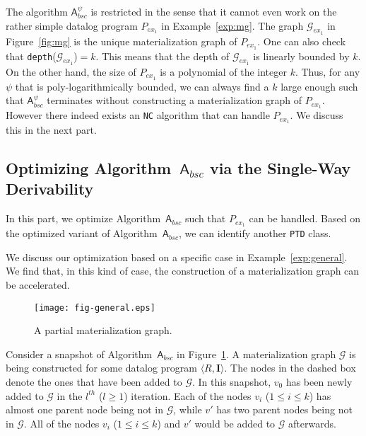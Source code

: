 \documentclass[final,1p,times]{elsarticle}
\begin{document}
The algorithm $\mathsf{A}_{bsc}^{\psi}$ is restricted in the sense that it cannot even work on the
rather simple datalog program $P_{ex_1}$ in Example~\ref{exp:mg}.
The graph $\mathcal{G}_{ex_1}$ in Figure~\ref{fig:mg} is the unique materialization graph of $P_{ex_1}$.
One can also check that \texttt{depth}($\mathcal{G}_{ex_1}$)$=k$.
This means that the depth of $\mathcal{G}_{ex_1}$ is linearly bounded by $k$.
On the other hand, the size of $P_{ex_1}$ is a polynomial of the integer $k$.
Thus, for any $\psi$ that is poly-logarithmically bounded, we can always find a $k$ large
enough such that $\mathsf{A}_{bsc}^{\psi}$ terminates without constructing a materialization
graph of $P_{ex_1}$.
However there indeed exists an \texttt{NC} algorithm that can handle $P_{ex_1}$.
We discuss this in the next part.

\subsection{Optimizing Algorithm~$\mathsf{A}_{bsc}$ via the Single-Way Derivability}

In this part, we optimize Algorithm~$\mathsf{A}_{bsc}$ such that $P_{ex_1}$
can be handled. Based on the optimized variant of Algorithm~$\mathsf{A}_{bsc}$,
we can identify another \texttt{PTD} class.

We discuss our optimization based on a specific case in Example~\ref{exp:general}.
We find that, in this kind of case, the construction of a materialization graph can be accelerated.

\begin{figure}[htbp]
\begin{center}
\texttt{[image: fig-general.eps]}
\caption{A partial materialization graph.}
\label{fig:general}
\end{center}
\end{figure}

\begin{example}\label{exp:general}
Consider a snapshot of Algorithm~$\mathsf{A}_{bsc}$ in
Figure~\ref{fig:general}. A materialization graph $\mathcal{G}$
is being constructed for some datalog program $\langle R, \textbf{I}\rangle$.
The nodes in the dashed box denote the ones that have been added to $\mathcal{G}$.
In this snapshot, $v_0$ has been newly added
to $\mathcal{G}$ in the $l^{th}$ ($l\geq 1$) iteration.
Each of the nodes $v_i$ ($1\leq i\leq k$) has almost one parent node being not in $\mathcal{G}$,
while $v'$ has two parent nodes being not in $\mathcal{G}$.
All of the nodes $v_i$ ($1\leq i\leq k$) and $v'$ would be added to $\mathcal{G}$
afterwards.
\end{example}
\end{document}

